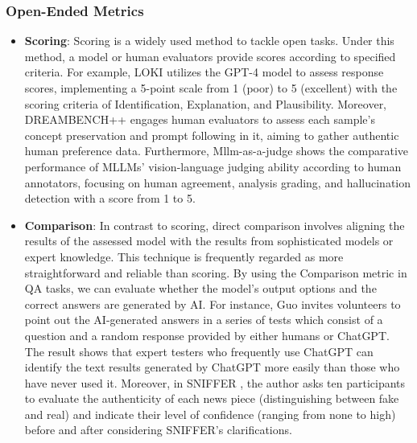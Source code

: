 \subsubsection{Open-Ended Metrics}
\begin{itemize}
    \item \textbf{Scoring}: Scoring is a widely used method to tackle open tasks. Under this method, a model or human evaluators provide scores according to specified criteria. For example, LOKI \cite{ye2024loki} utilizes the GPT-4 model to assess response scores, implementing a 5-point scale from 1 (poor) to 5 (excellent) with the scoring criteria of Identification, Explanation, and Plausibility. Moreover, DREAMBENCH++ \cite{peng2024dreambench++} engages human evaluators to assess each sample's concept preservation and prompt following in it, aiming to gather authentic human preference data. Furthermore, Mllm-as-a-judge \cite{chen2024mllm} shows the comparative performance of MLLMs' vision-language judging ability according to human annotators, focusing on human agreement, analysis grading, and hallucination detection with a score from 1 to 5.
    \item \textbf{Comparison}: In contrast to scoring, direct comparison involves aligning the results of the assessed model with the results from sophisticated models or expert knowledge. This technique is frequently regarded as more straightforward and reliable than scoring. By using the Comparison metric in QA tasks, we can evaluate whether the model's output options and the correct answers are generated by AI. For instance, Guo\cite{guo2023close} invites volunteers to point out the AI-generated answers in a series of tests which consist of a question and a random response provided by either humans or ChatGPT. The result shows that expert testers who frequently use ChatGPT can identify the text results generated by ChatGPT more easily than those who have never used it. Moreover, in SNIFFER \cite{qi2024sniffer}, the author asks ten participants to evaluate the authenticity of each news piece (distinguishing between fake and real) and indicate their level of confidence (ranging from none to high) before and after considering SNIFFER's clarifications.
\end{itemize}